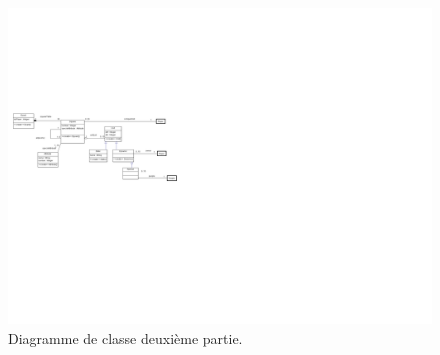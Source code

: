 \documentclass[11pt]{report}
\begin{document}
				\begin{figure}[!h]
\centering
\includegraphics[width=13cm]{Board.png}
\caption{Diagramme de classe deuxième partie.}
\end{figure}
\end{document}
